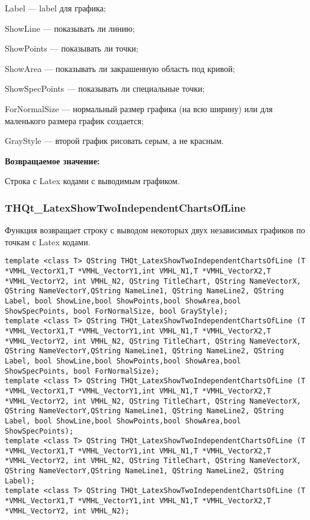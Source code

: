 \documentclass[a4paper,12pt]{article}
\begin{document}
    Label --- label для графика;
 
    ShowLine --- показывать ли линию;
 
    ShowPoints --- показывать ли точки;
 
    ShowArea --- показывать ли закрашенную область под кривой;
 
    ShowSpecPoints --- показывать ли специальные точки;
 
    ForNormalSize --- нормальный размер графика (на всю ширину) или для маленького размера график создается;
 
    GrayStyle --- второй график рисовать серым, а не красным.
	
\textbf{Возвращаемое значение:}

Строка с Latex кодами с выводимым графиком.


\subsubsection{THQt\_LatexShowTwoIndependentChartsOfLine}\label{THQt_LatexShowTwoIndependentChartsOfLine}

Функция возвращает строку с выводом некоторых двух независимых графиков по точкам с Latex кодами.


\begin{lstlisting}[label=code_syntax_THQt_LatexShowTwoIndependentChartsOfLine,caption=Синтаксис]
template <class T> QString THQt_LatexShowTwoIndependentChartsOfLine (T *VMHL_VectorX1,T *VMHL_VectorY1,int VMHL_N1,T *VMHL_VectorX2,T *VMHL_VectorY2, int VMHL_N2, QString TitleChart, QString NameVectorX, QString NameVectorY,QString NameLine1, QString NameLine2, QString Label, bool ShowLine,bool ShowPoints,bool ShowArea,bool ShowSpecPoints, bool ForNormalSize, bool GrayStyle);
template <class T> QString THQt_LatexShowTwoIndependentChartsOfLine (T *VMHL_VectorX1,T *VMHL_VectorY1,int VMHL_N1,T *VMHL_VectorX2,T *VMHL_VectorY2, int VMHL_N2, QString TitleChart, QString NameVectorX, QString NameVectorY,QString NameLine1, QString NameLine2, QString Label, bool ShowLine,bool ShowPoints,bool ShowArea,bool ShowSpecPoints, bool ForNormalSize);
template <class T> QString THQt_LatexShowTwoIndependentChartsOfLine (T *VMHL_VectorX1,T *VMHL_VectorY1,int VMHL_N1,T *VMHL_VectorX2,T *VMHL_VectorY2, int VMHL_N2, QString TitleChart, QString NameVectorX, QString NameVectorY,QString NameLine1, QString NameLine2, QString Label, bool ShowLine,bool ShowPoints,bool ShowArea,bool ShowSpecPoints);
template <class T> QString THQt_LatexShowTwoIndependentChartsOfLine (T *VMHL_VectorX1,T *VMHL_VectorY1,int VMHL_N1,T *VMHL_VectorX2,T *VMHL_VectorY2, int VMHL_N2, QString TitleChart, QString NameVectorX, QString NameVectorY,QString NameLine1, QString NameLine2, QString Label);
template <class T> QString THQt_LatexShowTwoIndependentChartsOfLine (T *VMHL_VectorX1,T *VMHL_VectorY1,int VMHL_N1,T *VMHL_VectorX2,T *VMHL_VectorY2, int VMHL_N2);
\end{lstlisting}
\end{document}
